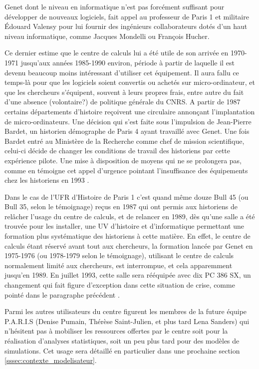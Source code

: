 Genet dont le niveau en informatique n'est pas forcément suffisant pour développer de nouveaux logiciels, fait appel au professeur de Paris 1 et militaire Édouard Valensy pour lui fournir des ingénieurs collaborateurs dotés d'un haut niveau informatique, comme Jacques Mondelli ou François Hucher.

Ce dernier estime que le centre de calculs lui a été utile de son arrivée en 1970-1971 jusqu'aux années 1985-1990 environ, période à partir de laquelle il est devenu beaucoup moins intéressant d'utiliser cet équipement. Il aura fallu ce temps-là pour que les logiciels soient convertis ou achetés sur micro-ordinateur, et que les chercheurs s'équipent, souvent à leurs propres frais, entre autre du fait d'une absence (volontaire?) de politique générale du CNRS. A partir de 1987 certains départements d'histoire reçoivent une circulaire annonçant l'implantation de micro-ordinateurs. Une décision qui s'est faite sous l'impulsion de Jean-Pierre Bardet, un historien démographe de Paris 4 ayant travaillé avec Genet. Une fois Bardet entré au Ministère de la Recherche comme chef de mission scientifique, celui-ci décide de changer les conditions de travail des historiens par cette expérience pilote. Une mise à disposition de moyens qui ne se prolongera pas, comme en témoigne cet appel d'urgence pointant l'insuffisance des équipements chez les historiens en 1993 \autocite{Genet1993}. %

Dans le cas de l'UFR d'Histoire de Paris 1 c'est quand même douze Bull 45 (ou Bull 35, selon le témoignage) reçus en 1987 qui ont permis aux historiens de relâcher l'usage du centre de calculs, et de relancer en 1989, dès qu'une salle a été trouvée pour les installer, une UV d'histoire et d'informatique permettant une formation plus systématique des historiens à cette matière. En effet, le centre de calculs étant réservé avant tout aux chercheurs, la formation lancée par Genet en 1975-1976 (ou 1978-1979 selon le témoignage), utilisant le centre de calculs normalement limité aux chercheurs, est interrompue, et cela apparemment jusqu'en 1989. En juillet 1993, cette salle sera rééquipée avec dix PC 386 SX, un changement qui fait figure d'exception dans cette situation de crise, comme pointé dans le paragraphe précédent \autocite{Genet1993}.

Parmi les autres utilisateurs du centre figurent les membres de la future équipe P.A.R.I.S (Denise Pumain, Thérèse Saint-Julien, et plus tard Lena Sanders) qui n'hésitent pas à mobiliser les ressources offertes par le centre soit pour la réalisation d'analyses statistiques, soit un peu plus tard pour des modèles de simulations. Cet usage sera détaillé en particulier dans une prochaine section \ref{sssec:contexte_modelisateur}.

